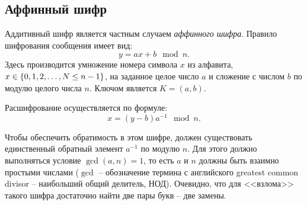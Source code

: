 \subsection{Аффинный шифр}\label{section-affine-cipher}

Аддитивный шифр является частным случаем \emph{аффинного шифра}. Правило шифрования сообщения имеет вид:
    \[ y = a x + b \mod n. \]
Здесь производится умножение номера символа $x$ из алфавита, $x\in \mathbb{\{} 0, 1, 2, \dots, N \leq n-1 \}$, на заданное целое число $a$ и сложение с числом $b$ по модулю целого числа $n$. Ключом является $K = (a, b)$.

Расшифрование осуществляется по формуле:
    \[ x = (y - b) a^{-1} \mod n. \]

Чтобы обеспечить обратимость в этом шифре, должен существовать единственный обратный элемент $a^{-1}$ по модулю $n$. Для этого должно выполняться условие $\gcd(a,n) = 1$, то есть $a$ и $n$ должны быть взаимно простыми числами ($\gcd$ -- обозначение термина с английского greatest common divisor -- наибольший общий делитель, $\text{НОД}$). Очевидно, что для <<взлома>> такого шифра достаточно найти две пары букв -- две замены.

